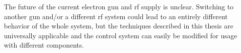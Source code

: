 The future of the current electron gun and \gls{rf} supply is unclear. Switching to another gun and/or a different \gls{rf} system could lead to an entirely different behavior of the whole system, but the techniques described in this thesis are universally applicable and the control system can easily be modified for usage with different components.